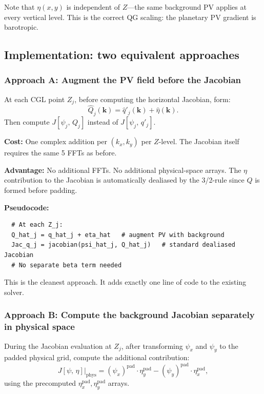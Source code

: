 \documentclass[11pt]{article}
\newcommand{\Jac}[2]{J\!\left[#1,\,#2\right]}
\newcommand{\hhat}[1]{\widehat{#1}}
\begin{document}
Note that $\eta(x,y)$ is independent of $Z$---the same background PV applies at every vertical level. This is the correct QG scaling: the planetary PV gradient is barotropic.

\subsection{Implementation: two equivalent approaches}

\subsubsection{Approach A: Augment the PV field before the Jacobian}

At each CGL point $Z_j$, before computing the horizontal Jacobian, form:
\begin{equation}
\hhat{Q}_j(\bm{k}) = \hhat{q}'_j(\bm{k}) + \hhat\eta(\bm{k}).
\end{equation}
Then compute $\Jac{\psi_j}{Q_j}$ instead of $\Jac{\psi_j}{q'_j}$.

\textbf{Cost:} One complex addition per $(k_x, k_y)$ per $Z$-level. The Jacobian itself requires the same 5 FFTs as before.

\textbf{Advantage:} No additional FFTs. No additional physical-space arrays. The $\eta$ contribution to the Jacobian is automatically dealiased by the 3/2-rule since $Q$ is formed before padding.

\textbf{Pseudocode:}
\begin{verbatim}
  # At each Z_j:
  Q_hat_j = q_hat_j + eta_hat   # augment PV with background
  Jac_q_j = jacobian(psi_hat_j, Q_hat_j)   # standard dealiased Jacobian
  # No separate beta term needed
\end{verbatim}

This is the cleanest approach. It adds exactly one line of code to the existing solver.

\subsubsection{Approach B: Compute the background Jacobian separately in physical space}

During the Jacobian evaluation at $Z_j$, after transforming $\psi_x$ and $\psi_y$ to the padded physical grid, compute the additional contribution:
\begin{equation}
\Jac{\psi}{\eta}\big|_{\mathrm{phys}} = (\psi_x)^{\mathrm{pad}} \cdot \eta_y^{\mathrm{pad}} - (\psi_y)^{\mathrm{pad}} \cdot \eta_x^{\mathrm{pad}},
\end{equation}
using the precomputed $\eta_x^{\mathrm{pad}}, \eta_y^{\mathrm{pad}}$ arrays.
\end{document}
